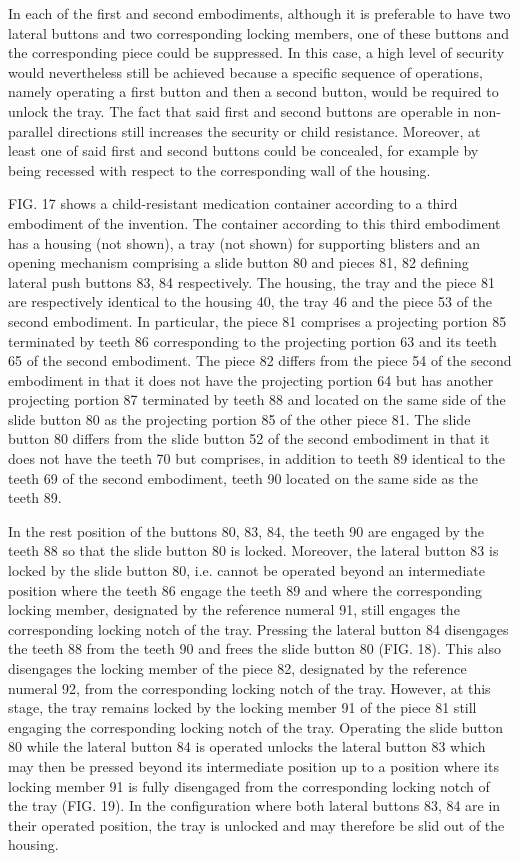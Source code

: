 \documentclass[11pt,a4paper]{article}
\begin{document}
In each of the first and second embodiments, although it is preferable to have two lateral buttons and two corresponding locking members, one of these buttons and the corresponding piece could be suppressed. In this case, a high level of security would nevertheless still be achieved because a specific sequence of operations, namely operating a first button and then a second button, would be required to unlock the tray. The fact that said first and second buttons are operable in non-parallel directions still increases the security or child resistance. Moreover, at least one of said first and second buttons could be concealed, for example by being recessed with respect to the corresponding wall of the housing.

FIG. 17 shows a child-resistant medication container according to a third embodiment of the invention. The container according to this third embodiment has a housing (not shown), a tray (not shown) for supporting blisters and an opening mechanism comprising a slide button 80 and pieces 81, 82 defining lateral push buttons 83, 84 respectively. The housing, the tray and the piece 81 are respectively identical to the housing 40, the tray 46 and the piece 53 of the second embodiment. In particular, the piece 81 comprises a projecting portion 85 terminated by teeth 86 corresponding to the projecting portion 63 and its teeth 65 of the second embodiment. The piece 82 differs from the piece 54 of the second embodiment in that it does not have the projecting portion 64 but has another projecting portion 87 terminated by teeth 88 and located on the same side of the slide button 80 as the projecting portion 85 of the other piece 81. The slide button 80 differs from the slide button 52 of the second embodiment in that it does not have the teeth 70 but comprises, in addition to teeth 89 identical to the teeth 69 of the second embodiment, teeth 90 located on the same side as the teeth 89.

In the rest position of the buttons 80, 83, 84, the teeth 90 are engaged by the teeth 88 so that the slide button 80 is locked. Moreover, the lateral button 83 is locked by the slide button 80, i.e. cannot be operated beyond an intermediate position where the teeth 86 engage the teeth 89 and where the corresponding locking member, designated by the reference numeral 91, still engages the corresponding locking notch of the tray. Pressing the lateral button 84 disengages the teeth 88 from the teeth 90 and frees the slide button 80 (FIG. 18). This also disengages the locking member of the piece 82, designated by the reference numeral 92, from the corresponding locking notch of the tray. However, at this stage, the tray remains locked by the locking member 91 of the piece 81 still engaging the corresponding locking notch of the tray. Operating the slide button 80 while the lateral button 84 is operated unlocks the lateral button 83 which may then be pressed beyond its intermediate position up to a position where its locking member 91 is fully disengaged from the corresponding locking notch of the tray (FIG. 19). In the configuration where both lateral buttons 83, 84 are in their operated position, the tray is unlocked and may therefore be slid out of the housing.
\end{document}
